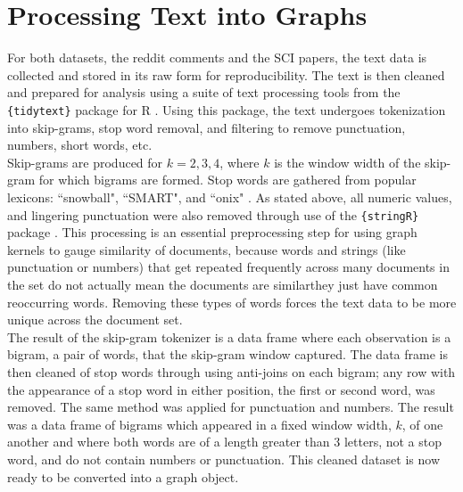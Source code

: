 %
%
%

\section{Processing Text into Graphs}

\hspace*{0.3cm} For both datasets, the reddit comments and the SCI papers, the text data is collected and stored in its raw form for reproducibility. The text is then cleaned and prepared for analysis using a suite of text processing tools from the \texttt{\{tidytext\}} package for R \cite{silge2016tidytext}. Using this package, the text undergoes tokenization into skip-grams, stop word removal, and filtering to remove punctuation, numbers, short words, etc. \\

Skip-grams are produced for $k=2,3,4$, where $k$ is the window width of the skip-gram for which bigrams are formed. Stop words are gathered from popular lexicons: ``snowball", ``SMART", and ``onix" \cite{silge2016tidytex}. As stated above, all numeric values, and lingering punctuation were also removed through use of the \texttt{\{stringR\}} package \cite{wickham2010stringr}. This processing is an essential preprocessing step for using graph kernels to gauge similarity of documents, because words and strings (like punctuation or numbers) that get repeated frequently across many documents in the set do not actually mean the documents are similar\textemdash they just have common reoccurring words. Removing these types of words forces the text data to be more unique across the document set.  \\

The result of the skip-gram tokenizer is a data frame where each observation is a bigram, a pair of words, that the skip-gram window captured. The data frame is then cleaned of stop words through using anti-joins on each bigram; any row with the appearance of a stop word in either position, the first or second word, was removed. The same method was applied for punctuation and numbers. The result was a data frame of bigrams which appeared in a fixed window width, $k$, of one another and where both words are of a length greater than 3 letters, not a stop word, and do not contain numbers or punctuation. This cleaned dataset is now ready to be converted into a graph object. \\

